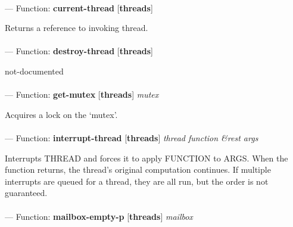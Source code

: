 \paragraph{}
\label{THREADS:CURRENT-THREAD}
--- Function: \textbf{current-thread} [\textbf{threads}] \textit{}

\begin{adjustwidth}{5em}{5em}
Returns a reference to invoking thread.
\end{adjustwidth}

\paragraph{}
\label{THREADS:DESTROY-THREAD}
--- Function: \textbf{destroy-thread} [\textbf{threads}] \textit{}

\begin{adjustwidth}{5em}{5em}
not-documented
\end{adjustwidth}

\paragraph{}
\label{THREADS:GET-MUTEX}
--- Function: \textbf{get-mutex} [\textbf{threads}] \textit{mutex}

\begin{adjustwidth}{5em}{5em}
Acquires a lock on the `mutex'.
\end{adjustwidth}

\paragraph{}
\label{THREADS:INTERRUPT-THREAD}
--- Function: \textbf{interrupt-thread} [\textbf{threads}] \textit{thread function \&rest args}

\begin{adjustwidth}{5em}{5em}
Interrupts THREAD and forces it to apply FUNCTION to ARGS.
When the function returns, the thread's original computation continues. If  multiple interrupts are queued for a thread, they are all run, but the order is not guaranteed.
\end{adjustwidth}

\paragraph{}
\label{THREADS:MAILBOX-EMPTY-P}
--- Function: \textbf{mailbox-empty-p} [\textbf{threads}] \textit{mailbox}

